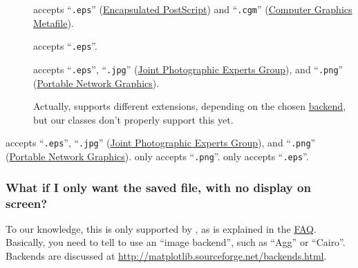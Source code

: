         \begin{description}
            \item[\Pygist{}] accepts ``\verb+.eps+''
            (\href{http://en.wikipedia.org/wiki/Encapsulated_PostScript}{Encapsulated
            PostScript}) and ``\verb+.cgm+''
            (\href{http://xml.coverpages.org/cgm.html}{Computer
            Graphics Metafile}).
        
            \item[\gnuplot{}] accepts ``\verb+.eps+''.
        
            \item[\Matplotlib{}] accepts ``\verb+.eps+'',
            ``\verb+.jpg+'' (\href{http://www.jpeg.org/}{Joint
            Photographic Experts Group}), and ``\verb+.png+''
            (\href{http://www.w3.org/Graphics/PNG/}{Portable Network
            Graphics}).
            
            \begin{reSTadmonition}[Attention]
                Actually, \Matplotlib{} supports different 
                extensions, depending on the chosen 
                \href{http://matplotlib.sourceforge.net/backends.html}{backend}, but our 
                 classes don't properly 
                support this yet.
            \end{reSTadmonition}
            
        \end{description}
        
    \Pygist{}  \Matplotlib{} accepts ``\verb+.eps+'', ``\verb+.jpg+''
    (\href{http://www.jpeg.org/}{Joint Photographic Experts Group}),
    and ``\verb+.png+''
    (\href{http://www.w3.org/Graphics/PNG/}{Portable Network
    Graphics}). \MayaVi{} only accepts ``\verb+.png+''. \gnuplot{} 
    only accepts ``\verb+.eps+''.
    
        \subsubsection{What if I only want the saved file, with no
        display on screen?} To our knowledge, this is only supported
        by \Matplotlib{}, as is explained in the
        \href{http://matplotlib.sourceforge.net/faq/howto_faq.html#generate-images-without-having-a-window-popup}{\Matplotlib{}
        FAQ}. Basically, you need to tell \Matplotlib{} to use an
        ``image backend'', such as ``Agg'' or ``Cairo''. Backends are
        discussed at
        \url{http://matplotlib.sourceforge.net/backends.html}.
        

